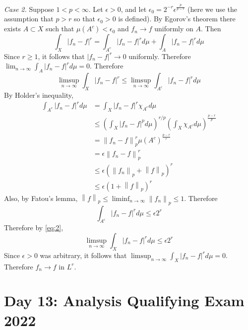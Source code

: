 \documentclass[answers]{exam}
\theoremstyle{problemstyle}
\newcommand{\norm}[1]{\left\lVert#1\right\rVert} %
\newcommand{\1}[1]{\textbf{1}_{\left[#1\right]}} %
\begin{document}
\begin{questions}
\begin{solution}
  \textit{Case 2.} Suppose $1<p<\infty$. Let $\epsilon>0$, and let $\epsilon_{0} = 2^{-r} \epsilon^{\frac{p}{p-r}}$ (here we use the assumption that $p>r$ so that $\epsilon_{0}>0$ is defined). By Egorov's theorem there exists $A\subset X$ such that $\mu(A^{c})<\epsilon_{0}$ and $f_{n}\to f$ uniformly on $A$. Then
  \begin{equation*}
    \int_{X} |f_{n}-f|^{r} = \int_{A^{c}}|f_{n}-f|^{r}d\mu + \int_{A}|f_{n}-f|^{r}d\mu
  \end{equation*}
  Since $r\geq 1$, it follows that $|f_{n}-f|^{r}\to 0$ uniformly. Therefore $\lim_{n\to\infty }\int_{A}|f_{n}-f|^{r}d\mu =0$. Therefore
  \begin{equation}\label{eq:2}
    \limsup_{n\to\infty} \int_{X} |f_{n}-f|^{r} \leq \limsup_{n\to\infty} \int_{A^{c}}|f_{n}-f|^{r}d\mu
  \end{equation}
  By Holder's inequality,
  \begin{align*}
    \int_{A^{c}}|f_{n}-f|^{r}d\mu
    &= \int_{X} |f_{n}-f|^{r}\chi_{A^{c}} d\mu\\
    &\leq \left( \int_{X}|f_{n}-f|^{p} d\mu\right)^{r/p}\left( \int_{X}\chi_{A^{c}}d\mu  \right)^{\frac{p-r}{p}}\\
    &= \norm{f_{n}-f}_{p}^{r}\mu(A^{c})^{\frac{p-r}{r}}\\
    &= \epsilon\norm{f_{n}-f}_{p}^{r}\\
    &\leq \epsilon ( \norm{f_{n}}_{p}+ \norm{f}_{p})^{r}\\
    &\leq \epsilon \left( 1 + \norm{f}_{p} \right)^{r}
  \end{align*}
  Also, by Fatou's lemma, $\norm{f}_{p}\leq \liminf_{n\to\infty} \norm{f_{n}}_{p}\leq 1$. Therefore
  \begin{equation*}
    \int_{A^{c}} | f_{n}-f|^{r}d\mu \leq \epsilon 2^{r}
  \end{equation*}
  Therefore by \eqref{eq:2},
  \begin{equation*}
     \limsup_{n\to\infty} \int_{X} |f_{n}-f|^{r}d\mu  \leq \epsilon 2^{r}
   \end{equation*}
   Since $\epsilon>0$ was arbitrary, it follows that $\limsup_{n\to\infty} \int_{X} |f_{n}-f|^{r}d\mu=0$. Therefore $f_{n}\to f$ in $L^{r}$.
\end{solution}




\newpage
\section{Day 13: Analysis Qualifying Exam 2022}


\end{questions}
\end{document}
